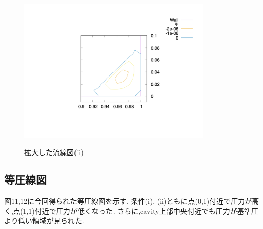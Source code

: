 \documentclass[upLaTeX,a4paper]{jsarticle}
\begin{document}
{\begin{figure}[H]
\begin{minipage}[c]{0.5\linewidth}
    \label{ラベル1}
  \end{minipage}
  \begin{minipage}[c]{0.5\linewidth}
    \centering
    \includegraphics[height=7cm, clip, trim=300 150 100 50]{outputs/img/stream_line_corner2_re200.png}
    \label{ラベル2}
  \end{minipage}
  \caption{拡大した流線図(ii)}\label{ラベル}
\end{figure}
}
\subsection{等圧線図}
図11,12に今回得られた等圧線図を示す.
条件(i), (ii)ともに点(0,1)付近で圧力が高く,点(1,1)付近で圧力が低くなった.
さらに,cavity上部中央付近でも圧力が基準圧より低い領域が見られた.
\end{document}
